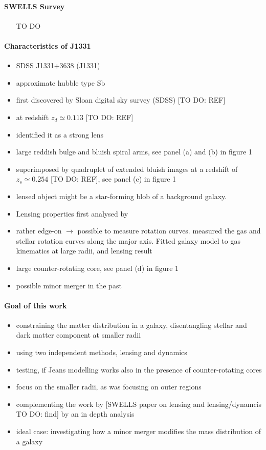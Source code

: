 \paragraph{SWELLS Survey}
\begin{itemize}
\item [TO DO]
\end{itemize}


\paragraph{Characteristics of J1331}
\begin{itemize}
\item SDSS J1331+3638 (J1331)
\item approximate hubble type Sb
\item first discovered by Sloan digital sky survey (SDSS) [TO DO: REF]
\item at redshift $z_d\simeq0.113$ [TO DO: REF]
\item \citet{SWELLSI} identified it as a strong lens
\item large reddish bulge and bluish spiral arms, see panel (a) and (b) in figure 1
\item superimposed by quadruplet of extended bluish images at a redshift of $z_s\simeq0.254$ [TO DO: REF], see panel (c) in figure 1
\item lensed object might be a star-forming blob of a background galaxy.
\item Lensing properties first analysed by \citet{SWELLSIII}
\item rather edge-on $\longrightarrow$ possible to measure rotation curves. \citet{SWELLSV} measured the gas and stellar rotation curves along the major axis. Fitted galaxy model to gas kinematics at large radii, and lensing result
\item large counter-rotating core, see panel (d) in figure 1
\item possible minor merger in the past
\end{itemize}

\paragraph{Goal of this work}
\begin{itemize}
\item constraining the matter distribution in a galaxy, disentangling stellar and dark matter component at smaller radii
\item using two independent methods, lensing and dynamics
\item testing, if Jeans modelling works also in the presence of counter-rotating cores
\item focus on the smaller radii, as \citet{SWELLSV} was focusing on outer regions
\item complementing the work by [SWELLS paper on lensing and lensing/dynamcis TO DO: find] by an in depth analysis
\item ideal case: investigating how a minor merger modifies the mass distribution of a galaxy
\end{itemize}


